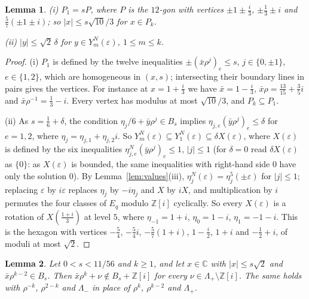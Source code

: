 \documentclass[11pt,a4paper]{amsart}
\newtheorem{lemma}{Lemma}
\theoremstyle{remark}
\newcommand{\Z}{\mathbb{Z}}
\newcommand{\C}{\mathbb{C}}
\begin{document}
\begin{lemma}\label{lem:radii}
\textup{(i)} $P_1=sP$, where $P$ is the $12$-gon with vertices $\pm1\pm\frac i3$, $\pm\frac13\pm i$ and
$\frac57(\pm1\pm i)$; so $|x|\le s\sqrt{10}/3$ for $x\in P_k$.

\textup{(ii)} $|y|\le\sqrt2\,\delta$ for $y\in Y^N_m(\varepsilon)$, $1\le m\le k$.
\end{lemma}

\begin{proof}
(i) $P_1$ is defined by the twelve inequalities $\pm(\bar x\rho^j)_e\le s$, $j\in\{0,\pm1\}$, $e\in\{1,2\}$, which
are homogeneous in $(x,s)$; intersecting their boundary lines in pairs gives the vertices. For instance at
$x=1+\frac i3$ we have $\bar x=1-\frac i3$, $\bar x\rho=\frac{13}{15}+\frac35i$ and $\bar x\rho^{-1}=\frac13-i$.
Every vertex has modulus at most $\sqrt{10}/3$, and $P_k\subseteq P_1$.

(ii) As $s=\frac16+\delta$, the condition $\eta_j/6+\bar y\rho^j\in B_s$ implies
$\eta_{j,e}(\bar y\rho^j)_e\le\delta$ for $e=1,2$, where $\eta_j=\eta_{j,1}+\eta_{j,2}i$. So
$Y^N_m(\varepsilon)\subseteq Y^N_1(\varepsilon)\subseteq\delta X(\varepsilon)$, where $X(\varepsilon)$ is defined by
the six inequalities $\eta^N_{j,e}(\bar y\rho^j)_e\le1$, $|j|\le1$ (for $\delta=0$ read $\delta X(\varepsilon)$ as
$\{0\}$: as $X(\varepsilon)$ is bounded, the same inequalities with right-hand side $0$ have only the solution $0$).
By Lemma~\ref{lem:values}(iii), $\eta^N_j(\varepsilon)=\eta^5_j(\pm\varepsilon)$ for $|j|\le1$; replacing
$\varepsilon$ by $i\varepsilon$ replaces $\eta_j$ by $-i\eta_j$ and $X$ by $iX$, and multiplication by $i$ permutes
the four classes of $E_q$ modulo $\Z[i]$ cyclically. So every $X(\varepsilon)$ is a rotation of $X(\frac{1+i}3)$ at
level $5$, where $\eta_{-1}=1+i$, $\eta_0=1-i$, $\eta_1=-1-i$. This is the hexagon with vertices $-\frac54$, $-\frac54i$,
$-\frac57(1+i)$, $1-\frac i2$, $1+i$ and $-\frac12+i$, of moduli at most $\sqrt2$.
\end{proof}

\begin{lemma}\label{lem:gapC}
Let $0<s<11/56$ and $k\ge1$, and let $x\in\C$ with $|x|\le s\sqrt2$ and $\bar x\rho^{k-2}\in B_s$. Then
$\bar x\rho^k+\nu\notin B_s+\Z[i]$ for every $\nu\in\Lambda_+\setminus\Z[i]$. The same holds with $\rho^{-k}$,
$\rho^{2-k}$ and $\Lambda_-$ in place of $\rho^k$, $\rho^{k-2}$ and $\Lambda_+$.
\end{lemma}
\end{document}
